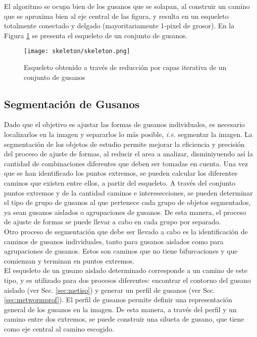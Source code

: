 El algoritmo se ocupa bien de los gusanos que se solapan, al construir un camino que 
se aproxima bien al eje central de las figura, y resulta en un esqueleto totalmente
conectado y delgado (mayoritariamente 1-pixel de grosor).
En la Figura \ref{fig:skeleton} se presenta el esqueleto de un conjunto de gusanos.

\begin{figure}[h t b p ! H]
 \centering
   \texttt{[image: skeleton/skeleton.png]}
 \caption{Esqueleto obtenido a trav\'es de reducci\'on por capas iterativa
   de un conjunto de gusanos}
\label{fig:skeleton}
\end{figure} 

\subsection{Segmentaci\'on de Gusanos}
\label{sec:metsegmentation}

Dado que el objetivo es ajustar las formas de gusanos individuales, es 
necesario localizarlos en la imagen y separarlos lo m\'as posible, 
\emph{i.e. }segmentar la imagen. La segmentaci\'on de los objetos 
de estudio permite mejorar la eficiencia y precisi\'on del proceso
de ajuste de formas, al reducir el area a analizar, disminiyuendo as\'i
la cantidad de combinaciones diferentes que deben ser tomadas en cuenta.
Una vez que se han identificado los puntos extremos, se pueden calcular
los diferentes caminos que existen entre ellos, a partir del esqueleto.
A trav\'es del conjunto puntos extremos y de la cantidad caminos e 
interesecciones, se pueden determinar el tipo de grupo de gusanos al que
pertenece cada grupo de objetos segmentados, ya sean gusanos aislados
o agrupaciones de gusanos. De esta manera, el proceso de ajuste de formas
se puede llevar a cabo en cada grupo por separado.\\

Otro proceso de segmentaci\'on que debe ser llevado a cabo es la identificaci\'on
de caminos de gusanos individuales, tanto para gusanos aislados como para agrupaciones
de gusanos. Estos son caminos que no tiene bifurcaciones y que comienzan y terminan
en puntos extremos.\\
El esqueleto de un gusano aislado determinado corresponde a un camino de este tipo, y es
utilizado para dos procesos diferentes: encontrar el contorno del gusano aislado 
(ver Sec. \ref{sec:metiso}) y generar un perfil de gusanos (ver Sec. \ref{sec:metwormprof}).
El perfil de gusanos permite definir una representaci\'on general de los gusanos en 
la imagen. De esta manera, a trav\'es del perfil y un camino entre dos extremos, se puede
construir una silueta de gusano, que tiene como eje central al camino escogido. \\

